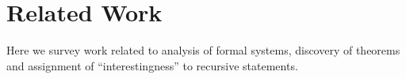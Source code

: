 \chapter{Related Work}

Here we survey work related to analysis of formal systems, discovery of theorems
and assignment of ``interestingness'' to recursive statements.


